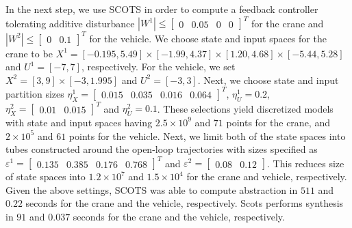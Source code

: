 In the next step, we use SCOTS in order to compute a feedback controller tolerating additive disturbance $|W^1|\leq\begin{bmatrix}0&0.05&0&0\end{bmatrix}^T$ for the crane and $|W^2|\leq\begin{bmatrix}0&0.1\end{bmatrix}^T$ for the vehicle. %
We choose state and input spaces for the crane to be $X^{1}=[-0.195,5.49]\times[-1.99,4.37]\times[1.20,4.68]\times[-5.44,5.28]$ and $U^{1}=[-7,7]$, respectively. For the vehicle, we set $X^{2}=[3,9]\times[-3,1.995]$ and $U^{2}=[-3,3]$. %
Next, we choose state and input partition sizes $\eta_{{X}}^{1}=\begin{bmatrix}0.015&0.035&0.016&0.064\end{bmatrix}^T$, $\eta_{U}^1=0.2$,  $\eta_{{X}}^2=\begin{bmatrix}0.01&0.015\end{bmatrix}^T$ and $\eta_{U}^2=0.1$. These selections yield discretized models with state and input spaces having $2.5\times 10^9$ and $71$ points for the crane, and $2\times 10^5$ and $61$ points for the vehicle. Next, we limit both of the state spaces into tubes constructed around the open-loop trajectories with sizes specified as $\varepsilon^{1}=\begin{bmatrix}0.135&0.385&0.176 &0.768\end{bmatrix}^T$ and $\varepsilon^{2}=\begin{bmatrix}0.08&0.12\end{bmatrix}$. This reduces size of state spaces into $1.2\times 10^7$ and $1.5\times 10^4$ for the crane and vehicle, respectively. Given the above settings, SCOTS was able to compute abstraction in $511$ and $0.22$ seconds for the crane and the vehicle, respectively. Scots performs synthesis in $91$ and $0.037$ seconds for the crane and the vehicle, respectively.
			


